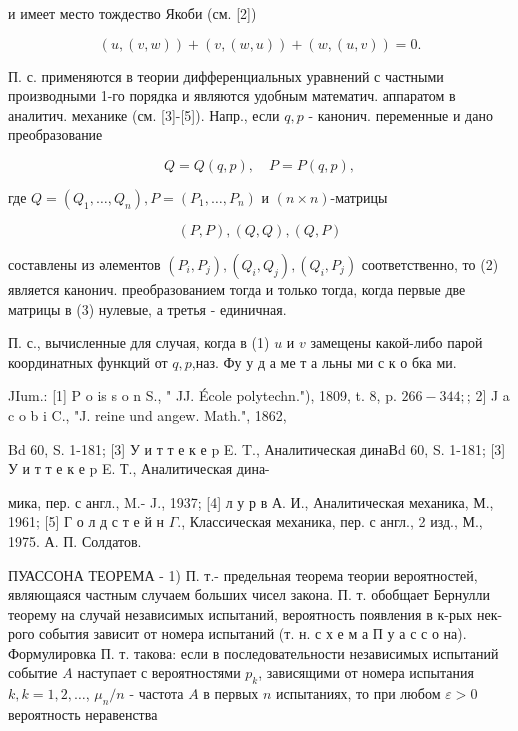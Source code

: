 \documentclass[10pt]{article}
\begin{document}
и имеет место тождество Якоби (см. [2])



\[

(u,(v, w))+(v,(w, u))+(w,(u, v))=0 .

\]



П. с. применяются в теории дифференциальных уравнений с частными производными 1-го порядка и являются удобным математич. аппаратом в аналитич. механике (см. [3]-[5]). Напр., если $q, p$ - канонич. переменные и дано преобразование



\[

Q=Q(q, p), \quad P=P(q, p),

\]



где $Q=\left(Q_{1}, \ldots, Q_{n}\right), P=\left(P_{1}, \ldots, P_{n}\right)$ и $(n \times n)$-матрицы



\[

(P, P),(Q, Q),(Q, P)

\]



составлены из әлементов $\left(P_{i}, P_{j}\right),\left(Q_{i}, Q_{j}\right),\left(Q_{i}, P_{j}\right)$ соответственно, то (2) является канонич. преобразованием тогда и только тогда, когда первые две матрицы в (3) нулевые, а третья - единичная.



П. с., вычисленные для случая, когда в (1) $u$ и $v$ замещены какой-либо парой координатных функций от $q, p$,наз. Фу у д а ме т а льны ми с к о бка ми.



JIum.: [1] P o is s o n S., " JJ. École polytechn."), 1809, t. 8, p. $266-344 ;$; 2] J a c o b i C., "J. reine und angew. Math.", 1862,

Bd 60, S. 1-181; [3] У и т т е к е p E. T., Аналитическая динаВd 60, S. 1-181; [3] У и т т е к е p E. Т., Аналитическая дина-

мика, пер. с англ., M.- J., 1937; [4] л у р в А. И., Аналитическая механика, М., 1961; [5] Г о л д с т е й н $\Gamma$., Классическая механика, пер. с англ., 2 изд., М., 1975. А. П. Солдатов.



ПУАССОНА ТЕОРЕМА - 1) П. т.- предельная теорема теории вероятностей, являющаяся частным случаем больших чисел закона. П. т. обобщает Бернулли теорему на случай независимых испытаний, вероятность появления в к-рых нек-рого события зависит от номера испытаний (т. н. с х е м а П у а с с о на). Формулировка П. т. такова: если в последовательности независимых испытаний событие $A$ наступает с вероятностями $p_{k}$, зависящими от номера испытания $k, k=1,2, \ldots$, $\mu_{n} / n$ - частота $A$ в первых $n$ испытаниях, то при любом $\varepsilon>0$ вероятность неравенства
\end{document}
